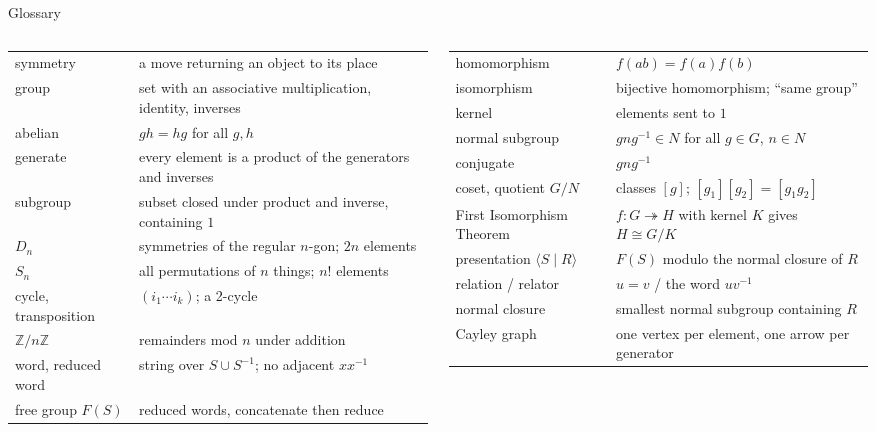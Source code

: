 \documentclass[aspectratio=169,10pt]{beamer}
\newcommand{\Z}{\mathbb{Z}}
\newcommand{\inv}{^{-1}}
\begin{document}
\begin{frame}{Glossary}
\footnotesize
\begin{columns}[T]
\begin{tabular}{@{}p{2.6cm}p{4.2cm}@{}}
symmetry & a move returning an object to its place\\
group & set with an associative multiplication, identity, inverses\\
abelian & $gh=hg$ for all $g,h$\\
generate & every element is a product of the generators and inverses\\
subgroup & subset closed under product and inverse, containing $1$\\
$D_n$ & symmetries of the regular $n$-gon; $2n$ elements\\
$S_n$ & all permutations of $n$ things; $n!$ elements\\
cycle, transposition & $(i_1\cdots i_k)$; a 2-cycle\\
$\Z/n\Z$ & remainders mod $n$ under addition\\
word, reduced word & string over $S\cup S\inv$; no adjacent $xx\inv$\\
free group $F(S)$ & reduced words, concatenate then reduce\\
\end{tabular}
\begin{tabular}{@{}p{2.6cm}p{4.2cm}@{}}
homomorphism & $f(ab)=f(a)f(b)$\\
isomorphism & bijective homomorphism; ``same group''\\
kernel & elements sent to $1$\\
normal subgroup & $gng\inv\in N$ for all $g\in G$, $n\in N$\\
conjugate & $gng\inv$\\
coset, quotient $G/N$ & classes $[g]$; $[g_1][g_2]=[g_1g_2]$\\
First Isomorphism Theorem & $f:G\twoheadrightarrow H$ with kernel $K$ gives $H\cong G/K$\\
presentation $\langle S\mid R\rangle$ & $F(S)$ modulo the normal closure of $R$\\
relation / relator & $u=v$ / the word $uv\inv$\\
normal closure & smallest normal subgroup containing $R$\\
Cayley graph & one vertex per element, one arrow per generator\\
\end{tabular}
\end{columns}
\end{frame}
\end{document}
